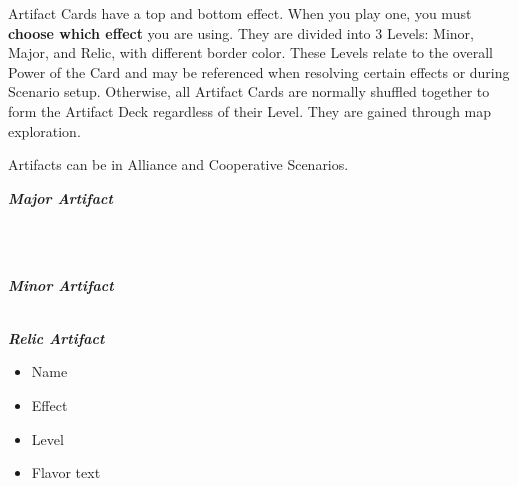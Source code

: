\begin{multicols*}{2}
Artifact Cards have a top and bottom effect. When you play one, you must \textbf{choose which effect} you are using.
They are divided into 3 Levels: Minor, Major, and Relic, with different border color.
These Levels relate to the overall Power of the Card and may be referenced when resolving certain effects or during Scenario setup.
Otherwise, all Artifact Cards are normally shuffled together to form the Artifact Deck regardless of their Level.
They are gained through map exploration.\par
Artifacts can be  in Alliance and Cooperative Scenarios.\par
\begin{multicols*}{2}
  \begin{scriptsize}
  \end{scriptsize}
  \footnotesize
    \null\hfill\textbf{\textit{\textcolor{darkcandyapplered}{Major Artifact}}}
  \columnbreak
  \begin{center}
    \phantom{\ldots}\\
    \phantom{\ldots}
    \begin{scriptsize}
    \end{scriptsize}\\
    \phantom{\ldots}\textbf{\textit{\textcolor{darkcandyapplered}{Minor Artifact}}}\\
    \vspace{3em}
    \phantom{\ldots}
    \begin{scriptsize}
    \end{scriptsize}\\
    \phantom{\ldots}\textbf{\textit{\textcolor{darkcandyapplered}{Relic Artifact}}}
  \end{center}
\end{multicols*}
\begin{multicols}{2}
  \footnotesize
  \begin{itemize}
    \item[\textbf{1.}] Name
    \item[\textbf{2.}] Effect
    \columnbreak
    \item[\textbf{3.}] Level
    \item[\textbf{4.}] Flavor text
  \end{itemize}
\end{multicols}


\end{multicols*}
